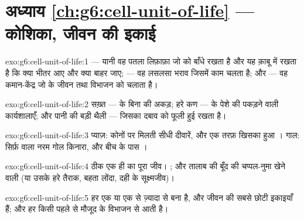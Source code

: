 \section*{अध्याय \ref{ch:g6:cell-unit-of-life} --- कोशिका, जीवन की इकाई}

\begin{solution}{exo:g6:cell-unit-of-life:1}
 --- यानी वह पतला लिफ़ाफ़ा जो  को बाँधे रखता है और यह क़ाबू
में रखता है कि क्या भीतर आए और क्या बाहर जाए;  --- वह लसलसा
भराव जिसमें काम चलता है; और  --- वह कमान-केंद्र जो  के
जीवन तथा विभाजन को चलाता है।
\end{solution}

\begin{solution}{exo:g6:cell-unit-of-life:2}
सख़्त  ---  के बिना  की अकड़; हरे कण ---
 के पेशे की  पकड़ने वाली कार्यशालाएँ; और पानी की बड़ी
थैली --- जिसका दबाव  को फूली हुई रखता है।
\end{solution}

\begin{solution}{exo:g6:cell-unit-of-life:3}
प्याज़: कोनों पर मिलती सीधी दीवारें, और एक तरफ़ खिसका हुआ । गाल:
सिर्फ़  वाला नरम गोल किनारा, और बीच के पास ।
\end{solution}

\begin{solution}{exo:g6:cell-unit-of-life:4}
ठीक एक ही  का पूरा जीव। ; और तालाब की बूँद की चप्पल-नुमा
खेने वाली (या उसके हरे तैराक, बहता लोंदा, दही के सूक्ष्मजीव)।
\end{solution}

\begin{solution}{exo:g6:cell-unit-of-life:5}
हर  एक या एक से ज़्यादा  से बना है, और  जीवन की सबसे
छोटी इकाइयाँ हैं; और हर  किसी पहले से मौजूद  के विभाजन से
आती है।
\end{solution}

